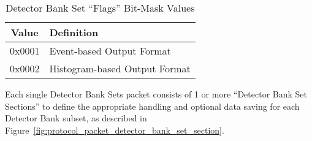 \begin{table}[h]
  \begin{center}
    \begin{tabular}{c | l}
	Value & Definition \\
	\hline
	0x0001 & Event-based Output Format \\
	0x0002 & Histogram-based Output Format \\
    \end{tabular}
  \end{center}
  \caption {Detector Bank Set ``Flags'' Bit-Mask Values}
  \label{table:protocol_detector_bank_set_flags}
\end{table}

Each single Detector Bank Sets packet consists of 1 or more
``Detector Bank Set Sections'' to define the appropriate handling
and optional data saving for each Detector Bank subset,
as described in Figure~\ref{fig:protocol_packet_detector_bank_set_section}.

